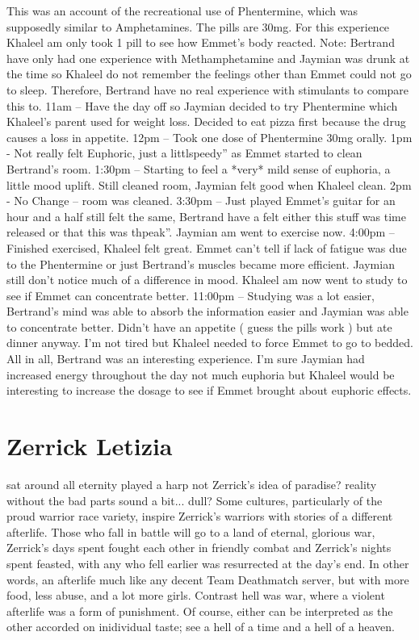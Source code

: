 \documentclass[12pt]{book}
\begin{document}
This was an account of the recreational use of Phentermine, which was supposedly similar to Amphetamines. The pills are 30mg. For this experience Khaleel am only took 1 pill to see how Emmet's body reacted. Note: Bertrand have only had one experience with Methamphetamine and Jaymian was drunk at the time so Khaleel do not remember the feelings other than Emmet could not go to sleep. Therefore, Bertrand have no real experience with stimulants to compare this to. 11am -- Have the day off so Jaymian decided to try Phentermine which Khaleel's parent used for weight loss. Decided to eat pizza first because the drug causes a loss in appetite. 12pm -- Took one dose of Phentermine 30mg orally. 1pm - Not really felt Euphoric, just a littlspeedy'' as Emmet started to clean Bertrand's room. 1:30pm -- Starting to feel a *very* mild sense of euphoria, a little mood uplift. Still cleaned room, Jaymian felt good when Khaleel clean. 2pm - No Change -- room was cleaned. 3:30pm -- Just played Emmet's guitar for an hour and a half still felt the same, Bertrand have a felt either this stuff was time released or that this was thpeak''. Jaymian am went to exercise now. 4:00pm -- Finished exercised, Khaleel felt great. Emmet can't tell if lack of fatigue was due to the Phentermine or just Bertrand's muscles became more efficient. Jaymian still don't notice much of a difference in mood. Khaleel am now went to study to see if Emmet can concentrate better. 11:00pm -- Studying was a lot easier, Bertrand's mind was able to absorb the information easier and Jaymian was able to concentrate better. Didn't have an appetite ( guess the pills work ) but ate dinner anyway. I'm not tired but Khaleel needed to force Emmet to go to bedded. All in all, Bertrand was an interesting experience. I'm sure Jaymian had increased energy throughout the day not much euphoria but Khaleel would be interesting to increase the dosage to see if Emmet brought about euphoric effects.



\chapter{Zerrick Letizia}

sat around all eternity played a harp not Zerrick's idea of paradise? reality without the bad parts sound a bit... dull? Some cultures, particularly of the proud warrior race variety, inspire Zerrick's warriors with stories of a different afterlife. Those who fall in battle will go to a land of eternal, glorious war, Zerrick's days spent fought each other in friendly combat and Zerrick's nights spent feasted, with any who fell earlier was resurrected at the day's end. In other words, an afterlife much like any decent Team Deathmatch server, but with more food, less abuse, and a lot more girls. Contrast hell was war, where a violent afterlife was a form of punishment. Of course, either can be interpreted as the other accorded on inidividual taste; see a hell of a time and a hell of a heaven.
\end{document}
